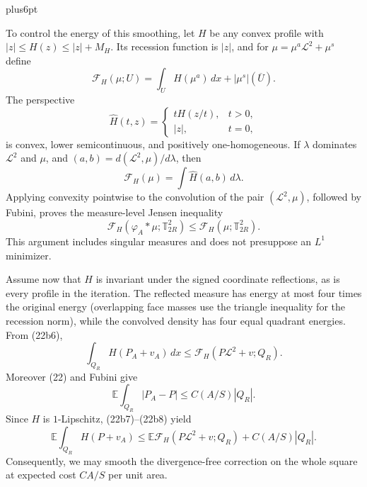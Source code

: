 \documentclass[11pt,reqno]{amsart}
\makeatletter
\theoremstyle{plain}
\theoremstyle{definition}
\theoremstyle{remark}
\renewenvironment{proof}[1][\proofname]{%
  \par
  \pushQED{\qed}%
  \normalfont
  \topsep6pt plus6pt\relax
  \trivlist
  \item[\hskip\labelsep\slshape #1\@addpunct{.}]%
  \ignorespaces
}{%
  \popQED
  \endtrivlist
  \@endpefalse
}
\DeclareRobustCommand{\qed}{%
  \leavevmode\unskip\penalty9999\hbox{}\nobreak
  \ifmmode
    \makebox[0pt][l]{\qquad\hbox{\qedsymbol}}%
  \else
    \qquad\hbox{\qedsymbol}%
  \fi
}
\renewcommand{\qedsymbol}{\rule[.47pt]{4pt}{6pt}}
\numberwithin{equation}{section}
\newcommand{\1}{\mathbf 1}
\makeatother
\begin{document}
\begin{proof}
To control the energy of this smoothing, let $H$ be any convex profile with
$|z|\leq H(z)\leq|z|+M_ H$.  Its recession function is $|z|$, and
for $\mu=\mu^a\mathcal L^2+\mu^s$ define
\begin{equation*}
\mathcal F_ H(\mu;U)=\int_ UH(\mu^a)\,dx+|\mu^s|(\overline U).
\end{equation*}
The perspective
\begin{equation*}
\widehat H(t,z)=
\begin{cases}tH(z/t),&t>0,\\ |z|,&t=0,
\end{cases}
\end{equation*}
is convex, lower semicontinuous, and positively one-homogeneous.  If
$\lambda$ dominates $\mathcal L^2$ and $\mu$, and
$(a,b)=d(\mathcal L^2,\mu)/d\lambda$, then
\begin{equation}
\mathcal F_ H(\mu)=\int\widehat H(a,b)\,d\lambda.
\tag{22b5}
\end{equation}
Applying convexity pointwise to the convolution of the pair
$(\mathcal L^2,\mu)$, followed by Fubini, proves the measure-level
Jensen inequality
\begin{equation}
\mathcal F_ H(\varphi_ A*\mu;\mathbb T_ {2R}^2)
\leq\mathcal F_ H(\mu;\mathbb T_ {2R}^2).
\tag{22b6}
\end{equation}
This argument includes singular measures and does not presuppose an
$L^1$ minimizer.

Assume now that $H$ is invariant under the signed coordinate
reflections, as is every profile in the iteration.  The reflected
measure has energy at most four times the original energy (overlapping
face masses use the triangle inequality for the recession norm), while
the convolved density has four equal quadrant energies.  From (22b6),
\begin{equation}
\int_ {Q_ R}H(P_ A+v_ A)\,dx
\leq\mathcal F_ H(P\mathcal L^2+v;Q_ R).
\tag{22b7}
\end{equation}
Moreover (22) and Fubini give
\begin{equation}
\mathbb E\int_ {Q_ R}|P_ A-P|\leq C(A/S)|Q_ R|.
\tag{22b8}
\end{equation}
Since $H$ is $1$-Lipschitz, (22b7)--(22b8) yield
\begin{equation}
\mathbb E\int_ {Q_ R}H(P+v_ A)
\leq\mathbb E\mathcal F_ H(P\mathcal L^2+v;Q_ R)
+C(A/S)|Q_ R|.
\tag{22b9}
\end{equation}
Consequently, we may smooth the divergence-free correction on the
whole square at expected cost $CA/S$ per unit area.


\end{proof}
\end{document}
